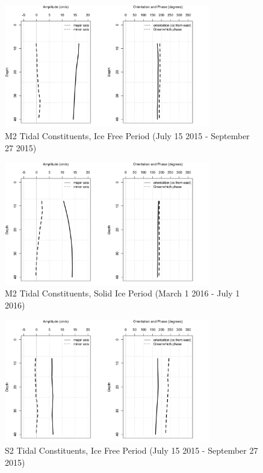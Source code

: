 \documentclass[12pt]{dforeport}
\begin{document}
\begin{figure}  
\centering
\includegraphics[width = 0.8\textwidth]{./figures/53_M2TC_if_2015.png}
\caption[M2 Tidal Constituents, Ice free, 2015]{M2 Tidal Constituents, Ice Free Period (July 15 2015 - September 27 2015)}
\label{f:m2_if_2015}
\end{figure}

\begin{figure}  
\centering
\includegraphics[width = 0.8\textwidth]{./figures/54_M2TC_si_2015.png}
\caption[M2 Tidal Constituents, Solid Ice, 2015]{M2 Tidal Constituents, Solid Ice Period (March 1 2016 - July 1 2016)}
\label{f:m2_si_2015}
\end{figure}


\begin{figure}  
\centering
\includegraphics[width = 0.8\textwidth]{./figures/55_S2TC_if_2015.png}
\caption[S2 Tidal Constituents, Ice free, 2015]{S2 Tidal Constituents, Ice Free Period (July 15 2015 - September 27 2015)}
\label{f:s2_if_2015}
\end{figure}
\end{document}
